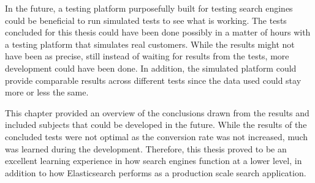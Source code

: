 In the future, a testing platform purposefully built for testing search engines could be beneficial 
to run simulated tests to see what is working.
The tests concluded for this thesis could have been done possibly in a matter of hours with a testing platform
that simulates real customers.
While the results might not have been as precise, still instead of waiting for results from the tests,
more development could have been done.
In addition, the simulated platform could provide comparable results across different tests since the data used
could stay more or less the same.





This chapter provided an overview of the conclusions drawn from the results and included subjects that could be
developed in the future.
While the results of the concluded tests were not optimal as the conversion rate was not increased,
much was learned during the development.
Therefore, this thesis proved to be an excellent learning experience in how search engines function at a lower level, 
in addition to how Elasticsearch performs as a production scale search application.



